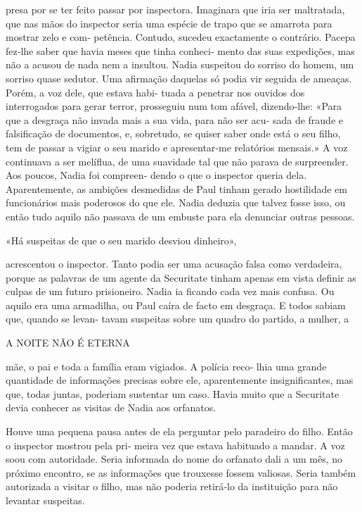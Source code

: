 presa por se ter feito passar por inspectora. Imaginara que iria ser
maltratada, que nas mãos do inspector seria uma espécie de trapo que se
amarrota para mostrar zelo e com‑ petência. Contudo, sucedeu exactamente
o contrário. Pacepa fez‑lhe saber que havia meses que tinha conheci‑
mento das suas expedições, mas não a acusou de nada nem a insultou.
Nadia suspeitou do sorriso do homem, um sorriso quase sedutor. Uma
afirmação daquelas só podia vir seguida de ameaças. Porém, a voz dele,
que estava habi‑ tuada a penetrar nos ouvidos dos interrogados para
gerar terror, prosseguiu num tom afável, dizendo‑lhe: «Para que a
desgraça não invada mais a sua vida, para não ser acu‑ sada de fraude e
falsificação de documentos, e, sobretudo, se quiser saber onde está o
seu filho, tem de passar a vigiar o seu marido e apresentar‑me
relatórios mensais.» A voz continuava a ser melíflua, de uma suavidade
tal que não parava de surpreender. Aos poucos, Nadia foi compreen‑ dendo
o que o inspector queria dela. Aparentemente, as ambições desmedidas de
Paul tinham gerado hostilidade em funcionários mais poderosos do que
ele. Nadia deduzia que talvez fosse isso, ou então tudo aquilo não
passava de um embuste para ela denunciar outras pessoas.

«Há suspeitas de que o seu marido desviou dinheiro»,

acrescentou o inspector. Tanto podia ser uma acusação falsa como
verdadeira, porque as palavras de um agente da Securitate tinham apenas
em vista definir as culpas de um futuro prisioneiro. Nadia ia ficando
cada vez mais confusa. Ou aquilo era uma armadilha, ou Paul caíra de
facto em desgraça. E todos sabiam que, quando se levan‑ tavam suspeitas
sobre um quadro do partido, a mulher, a

A NOITE NÃO É ETERNA

mãe, o pai e toda a família eram vigiados. A polícia reco‑ lhia uma
grande quantidade de informações precisas sobre ele, aparentemente
insignificantes, mas que, todas juntas, poderiam sustentar um caso.
Havia muito que a Securitate devia conhecer as visitas de Nadia aos
orfanatos.

Houve uma pequena pausa antes de ela perguntar pelo paradeiro do filho.
Então o inspector mostrou pela pri‑ meira vez que estava habituado a
mandar. A voz soou com autoridade. Seria informada do nome do orfanato
dali a um mês, no próximo encontro, se as informações que trouxesse
fossem valiosas. Seria também autorizada a visitar o filho, mas não
poderia retirá‑lo da instituição para não levantar suspeitas.

